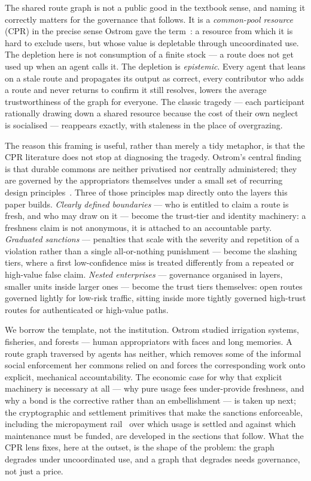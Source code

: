 \documentclass[11pt]{article}
\begin{document}
The shared route graph is not a public good in the textbook sense, and naming it
correctly matters for the governance that follows. It is a \emph{common-pool
resource} (CPR) in the precise sense Ostrom gave the term~\cite{ostrom}: a
resource from which it is hard to exclude users, but whose value is depletable
through uncoordinated use. The depletion here is not consumption of a finite
stock --- a route does not get used up when an agent calls it. The depletion is
\emph{epistemic}. Every agent that leans on a stale route and propagates its
output as correct, every contributor who adds a route and never returns to
confirm it still resolves, lowers the average trustworthiness of the graph for
everyone. The classic tragedy --- each participant rationally drawing down a
shared resource because the cost of their own neglect is socialised --- reappears
exactly, with staleness in the place of overgrazing.

The reason this framing is useful, rather than merely a tidy metaphor, is that
the CPR literature does not stop at diagnosing the tragedy. Ostrom's central
finding is that durable commons are neither privatised nor centrally
administered; they are governed by the appropriators themselves under a small set
of recurring design principles~\cite{ostrom}. Three of those principles map
directly onto the layers this paper builds. \emph{Clearly defined boundaries} ---
who is entitled to claim a route is fresh, and who may draw on it --- become the
trust-tier and identity machinery: a freshness claim is not anonymous, it is
attached to an accountable party. \emph{Graduated sanctions} --- penalties that
scale with the severity and repetition of a violation rather than a single
all-or-nothing punishment --- become the slashing tiers, where a first
low-confidence miss is treated differently from a repeated or high-value false
claim. \emph{Nested enterprises} --- governance organised in layers, smaller
units inside larger ones --- become the trust tiers themselves: open routes
governed lightly for low-risk traffic, sitting inside more tightly governed
high-trust routes for authenticated or high-value paths.

We borrow the template, not the institution. Ostrom studied irrigation systems,
fisheries, and forests --- human appropriators with faces and long memories. A
route graph traversed by agents has neither, which removes some of the
informal social enforcement her commons relied on and forces the
corresponding work onto explicit, mechanical accountability. The economic case
for why that explicit machinery is necessary at all --- why pure usage fees
under-provide freshness, and why a bond is the corrective rather than an
embellishment --- is taken up next; the cryptographic and settlement primitives
that make the sanctions enforceable, including the micropayment rail~\cite{x402}
over which usage is settled and against which maintenance must be funded, are
developed in the sections that follow. What the CPR lens fixes, here
at the outset, is the shape of the problem: the graph degrades under uncoordinated
use, and a graph that degrades needs governance, not just a price.
\end{document}
